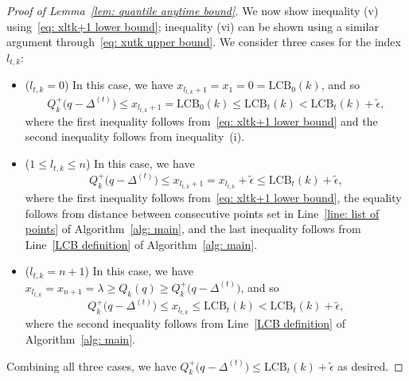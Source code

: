 \begin{proof}[Proof of Lemma~\ref{lem:  quantile anytime bound}]
    We now show inequality (v) using~\eqref{eq: xltk+1 lower bound}; inequality (vi)
         can be shown using a similar argument through~\eqref{eq: xutk upper bound}.
        We consider three cases for the index $l_{t, k}$:
        \begin{itemize}
            \item ($l_{t, k} = 0$) In this case, we have 
                    $x_{l_{t, k} + 1} = x_{1} =  0 = \mathrm{LCB}_0(k)$, and so
                    \begin{equation}
                       Q^+_k\big( q -  \Delta^{(t)} \big)
                        \le 
                        x_{l_{t, k} + 1} =
                        \mathrm{LCB}_0(k)
                        \le 
                        \mathrm{LCB}_t(k)
                        < \mathrm{LCB}_t(k) + \tilde{\epsilon},
                    \end{equation}
                    where the first inequality follows from~\eqref{eq: xltk+1 lower bound} and the second inequality follows from inequality~(i).
            
            \item ($1 \le l_{t, k} \le n$) In this case, we have
                    \begin{equation}
                   Q^+_k\big( q -  \Delta^{(t)} \big)
                    \le x_{l_{t, k} + 1}
                    = x_{l_{t, k}} + \tilde{\epsilon}
                    \le \mathrm{LCB}_t(k) + \tilde{\epsilon},
                \end{equation}
                where the first inequality follows from~\eqref{eq: xltk+1 lower bound}, the equality follows from distance between
                consecutive points set in Line~\ref{line: list of points} of Algorithm~\ref{alg: main}, 
                and the last inequality follows from Line~\ref{LCB definition} of Algorithm~\ref{alg: main}.

           \item  ($l_{t, k} = n+1$) In this case, we have  $x_{l_{t, k}} = x_{n+1} = \lambda \ge Q_k(q) \ge  Q^+_k\big( q -  \Delta^{(t)} \big)$,
           and so
                    \begin{equation}
                       Q^+_k\big( q -  \Delta^{(t)} \big) \le 
                        x_{l_{t, k}}  \le 
                        \mathrm{LCB}_t(k)
                        < \mathrm{LCB}_t(k) + \tilde{\epsilon},
                    \end{equation}
                    where the second inequality follows from Line~\ref{LCB definition} of Algorithm~\ref{alg: main}.
        \end{itemize}
    Combining all three cases, we have
    $Q^+_k\big( q -  \Delta^{(t)} \big)
        \le \mathrm{LCB}_t(k) + \tilde{\epsilon}$ as desired.
\end{proof}


